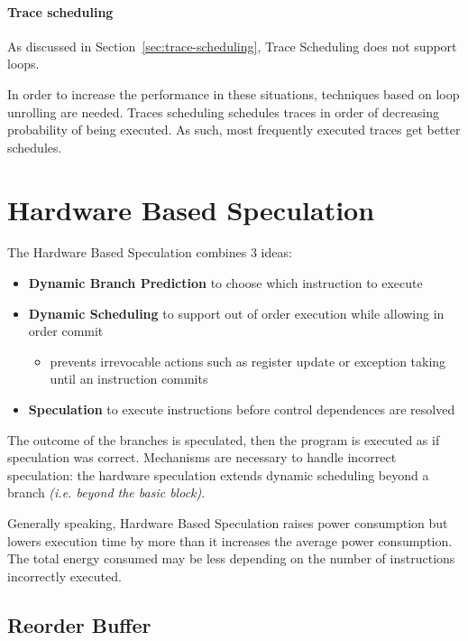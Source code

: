 \documentclass[english]{article}
\begin{document}
\paragraph{Trace scheduling}
\label{par:trace-scheduling}

As discussed in Section~\ref{sec:trace-scheduling}, Trace Scheduling does not support loops.

In order to increase the performance in these situations, techniques based on loop unrolling are needed.
Traces scheduling schedules traces in order of decreasing probability of being executed.
As such, most frequently executed traces get better schedules.

\clearpage

\section{Hardware Based Speculation}

The Hardware Based Speculation combines \(3\) ideas:

\begin{itemize}
  \item \textbf{Dynamic Branch Prediction} to choose which instruction to execute
  \item \textbf{Dynamic Scheduling} to support out of order execution while allowing in order commit
        \begin{itemize}
          \item prevents irrevocable actions such as register update or exception taking until an instruction commits
        \end{itemize}
  \item \textbf{Speculation} to execute instructions before control dependences are resolved
\end{itemize}

The outcome of the branches is speculated, then the program is executed as if speculation was correct.
Mechanisms are necessary to handle incorrect speculation: the hardware speculation extends dynamic scheduling beyond a branch \textit{(i.e. beyond the basic block)}.

\bigskip
Generally speaking, Hardware Based Speculation raises power consumption but lowers execution time by more than it increases the average power consumption.
The total energy consumed may be less depending on the number of instructions incorrectly executed.

\subsection{Reorder Buffer}
\end{document}
